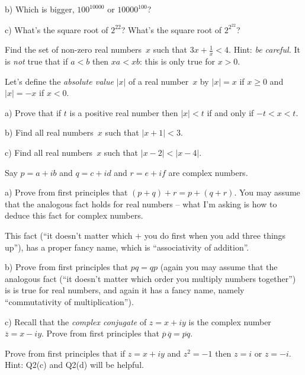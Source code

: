 \documentclass[10pt]{article}
\begin{document}
b) Which is bigger, $100^{10000}$ or $10000^{100}$?

c) What's the square root of $2^{22}$? What's the square root of $2^{2^{22}}$?

\medskip
{} Find the set of non-zero real numbers~$x$ such that $3x+\frac{1}{x}<4$. Hint: \emph{be careful.} It is \emph{not} true that if $a<b$ then $xa<xb$: this is only true for $x>0$.

\medskip
{} Let's define the \emph{absolute value} $|x|$ of a real number~$x$ by $|x|=x$ if $x\geq0$ and $|x|=-x$ if $x<0$.

a) Prove that if $t$ is a positive real number then $|x|<t$ if and only if $-t<x<t$.

b) Find all real numbers~$x$ such that $|x+1|<3$.

c) Find all real numbers~$x$ such that $|x-2|<|x-4|$.

\medskip{} Say $p=a+ib$ and $q=c+id$ and $r=e+if$ are complex numbers.

a) Prove from first principles that $(p+q)+r=p+(q+r)$. You may assume that the analogous fact holds for real numbers -- what I'm asking is how to deduce this fact for complex numbers. 

This fact (``it doesn't matter which $+$ you do first when you add three things up''), has a proper fancy name, which is ``associativity of addition''.

b) Prove from first principles that $pq=qp$ (again you may assume that the analogous fact (``it doesn't matter which order you multiply numbers together'') is is true for real numbers, and again it has a fancy name, namely ``commutativity of multiplication'').

c) Recall that the \emph{complex conjugate} of $z=x+iy$ is the complex number $\overline{z}=x-iy$. Prove from first principles that $\overline{p}\,\overline{q}=\overline{pq}$.

\medskip{} Prove from first principles that if $z=x+iy$ and $z^2=-1$ then $z=i$ or $z=-i$. Hint: Q2(c) and Q2(d) will be helpful. 
\end{document}
